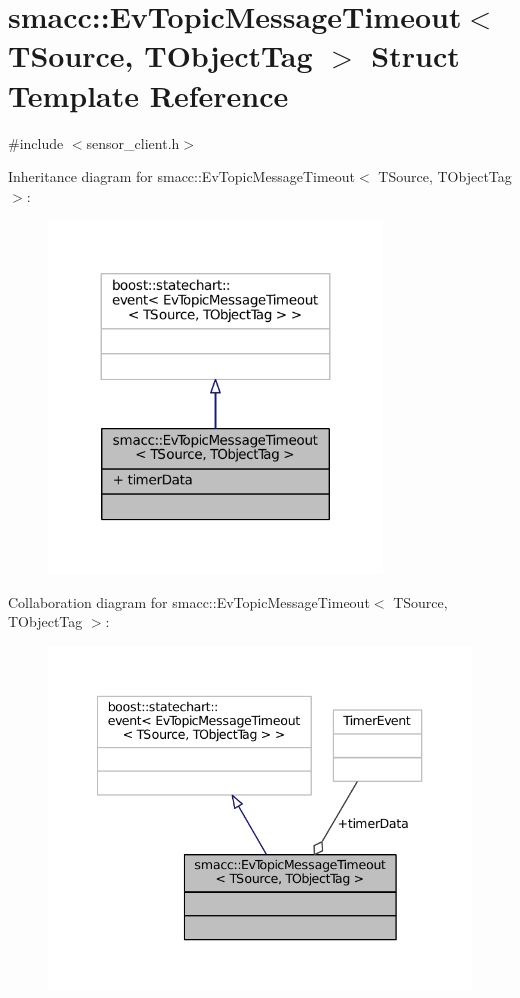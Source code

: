 \hypertarget{structsmacc_1_1EvTopicMessageTimeout}{}\section{smacc\+:\+:Ev\+Topic\+Message\+Timeout$<$ T\+Source, T\+Object\+Tag $>$ Struct Template Reference}
\label{structsmacc_1_1EvTopicMessageTimeout}


{\ttfamily \#include $<$sensor\+\_\+client.\+h$>$}



Inheritance diagram for smacc\+:\+:Ev\+Topic\+Message\+Timeout$<$ T\+Source, T\+Object\+Tag $>$\+:
\nopagebreak
\begin{figure}[H]
\begin{center}
\leavevmode
\includegraphics[width=251pt]{structsmacc_1_1EvTopicMessageTimeout__inherit__graph}
\end{center}
\end{figure}


Collaboration diagram for smacc\+:\+:Ev\+Topic\+Message\+Timeout$<$ T\+Source, T\+Object\+Tag $>$\+:
\nopagebreak
\begin{figure}[H]
\begin{center}
\leavevmode
\includegraphics[width=340pt]{structsmacc_1_1EvTopicMessageTimeout__coll__graph}
\end{center}
\end{figure}
